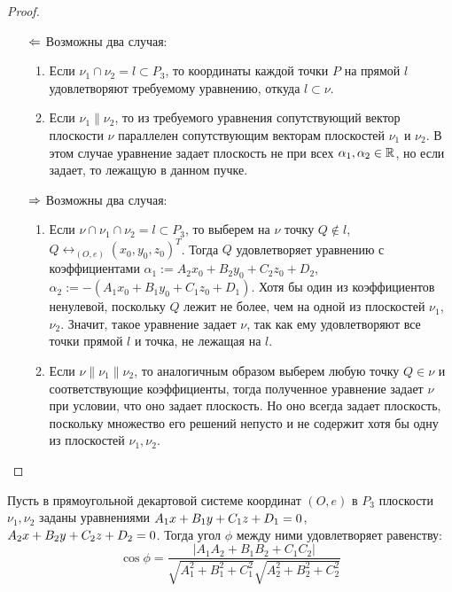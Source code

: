 \begin{proof}~
	\begin{itemize}
		\item[$\Leftarrow$] Возможны два случая:
		\begin{enumerate}
			\item Если $\nu_1 \cap \nu_2 = l \subset P_3$, то координаты каждой точки $P$ на прямой $l$ удовлетворяют требуемому уравнению, откуда $l \subset \nu$.
			\item Если $\nu_1 \parallel \nu_2$, то из требуемого уравнения сопутствующий вектор плоскости $\nu$ параллелен сопутствующим векторам плоскостей $\nu_1$ и $\nu_2$. В этом случае уравнение задает плоскость не при всех $\alpha_1, \alpha_2 \in \mathbb{R}$, но если задает, то лежащую в данном пучке.
		\end{enumerate}
		
		\item[$\Rightarrow$] Возможны два случая:
		\begin{enumerate}
			\item Если $\nu \cap \nu_1 \cap \nu_2 = l \subset P_3$, то выберем на $\nu$ точку $Q \not\in l$, $Q \leftrightarrow_{(O, e)} (x_0, y_0, z_0)^T$. Тогда $Q$ удовлетворяет уравнению с коэффициентами $\alpha_1 := A_2x_0+B_2y_0+C_2z_0 + D_2$, $\alpha_2 := -(A_1x_0+B_1y_0+C_1z_0 + D_1)$. \pagebreak Хотя бы один из коэффициентов ненулевой, поскольку $Q$ лежит не более, чем на одной из плоскостей $\nu_1$, $\nu_2$. Значит, такое уравнение задает $\nu$, так как ему удовлетворяют все точки прямой $l$ и точка, не лежащая на $l$.
			
			\item Если $\nu \parallel \nu_1 \parallel \nu_2$, то аналогичным образом выберем любую точку $Q \in \nu$ и соответствующие коэффициенты, тогда полученное уравнение задает $\nu$ при условии, что оно задает плоскость. Но оно всегда задает плоскость, поскольку множество его решений непусто и не содержит хотя бы одну из плоскостей $\nu_1, \nu_2$.\qedhere
		\end{enumerate}
	\end{itemize}
\end{proof}

\begin{proposition}
	Пусть в прямоугольной декартовой системе координат $(O, e)$ в $P_3$ плоскости $\nu_1, \nu_2$ заданы уравнениями $A_1x\hm{+}B_1y+C_1z+D_1=0$, $A_2x\hm{+}B_2y\hm{+}C_2z+D_2=0$. Тогда угол $\phi$ между ними удовлетворяет равенству:
	\[\cos{\phi} = \frac{|A_1A_2+B_1B_2+C_1C_2|}{\sqrt{A_1^2+B_1^2+C_1^2}\sqrt{A_2^2+B_2^2+C_2^2}}\]
\end{proposition}

